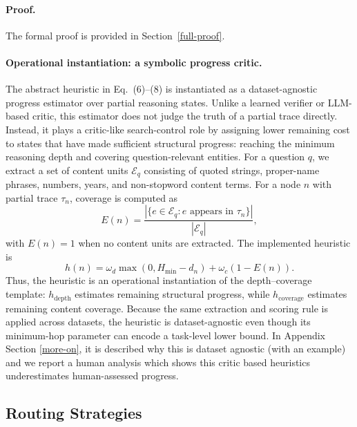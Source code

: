 \documentclass{article}
\begin{document}
\paragraph{Proof.}
The formal proof is provided in Section~\ref{full-proof}.




\paragraph{Operational instantiation: a symbolic progress critic.}
The abstract heuristic in Eq.~(6)--(8) is instantiated as a
dataset-agnostic progress estimator over partial reasoning states. Unlike
a learned verifier or LLM-based critic, this estimator does not judge the
truth of a partial trace directly. Instead, it plays a critic-like
search-control role by assigning lower remaining cost to states that have
made sufficient structural progress: reaching the minimum reasoning depth
and covering question-relevant entities. For a question \(q\), we extract
a set of content units \(\mathcal{E}_q\) consisting of quoted strings,
proper-name phrases, numbers, years, and non-stopword content terms. For
a node \(n\) with partial trace \(\tau_n\), coverage is computed as
\[
E(n)=
\frac{|\{e\in\mathcal{E}_q: e \text{ appears in } \tau_n\}|}
{|\mathcal{E}_q|},
\]
with \(E(n)=1\) when no content units are extracted. The implemented
heuristic is
\[
h(n)
=
\omega_d\max(0,H_{\min}-d_n)
+
\omega_c(1-E(n)).
\]
Thus, the heuristic is an operational instantiation of the
depth--coverage template: \(h_{\mathrm{depth}}\) estimates remaining
structural progress, while \(h_{\mathrm{coverage}}\) estimates remaining
content coverage. Because the same extraction and scoring rule is applied
across datasets, the heuristic is dataset-agnostic even though its
minimum-hop parameter can encode a task-level lower bound. In Appendix Section \ref{more-on}, it is described why this is dataset agnostic (with an example) and we report a human analysis which shows this critic based heuristics underestimates human-assessed progress.





\subsection{Routing Strategies}
\label{sec:routing}
\end{document}
